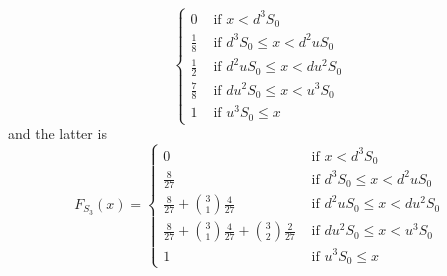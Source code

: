 \documentclass{report}
\begin{document}
{\begin{minipage}{39em}
\begin{equation}
\begin{cases}
  0& \text{ if  }x<d^3S_0\\
  \frac{1}{8}& \text{ if  }d^3S_0\leq x<d^2uS_0\\
  \frac{1}{2}& \text{ if  }d^2uS_0\leq x<du^2S_0\\
  \frac{7}{8}& \text{ if  }du^2S_0\leq x<u^3S_0\\
  1& \text{ if  }u^3S_0\leq x
\end{cases}
\end{equation}
and the latter is
\begin{equation}
F_{S_3}(x)=\begin{cases}
  0& \text{ if  }x<d^3S_0\\
  \frac{8}{27}& \text{ if  }d^3S_0\leq x<d^2uS_0\\
  \frac{8}{27}+\binom{3}{1}\frac{4}{27}& \text{ if  }d^2uS_0\leq x<du^2S_0\\
  \frac{8}{27}+\binom{3}{1}\frac{4}{27}+\binom{3}{2}\frac{2}{27}& \text{ if  }du^2S_0\leq x<u^3S_0\\
  1& \text{ if  }u^3S_0\leq x
\end{cases}
\end{equation}
\end{minipage}}
\end{document}
